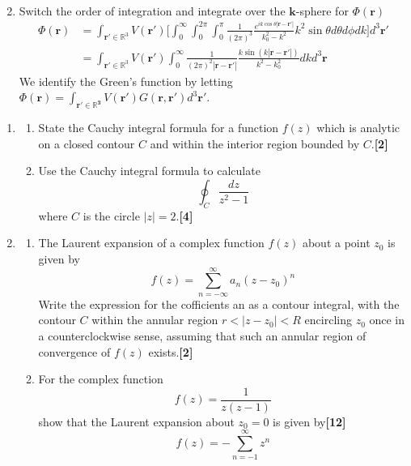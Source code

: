 \documentclass[a4paper]{article}
\begin{document}
\begin{ans}
\begin{enumerate}[label=(\roman*)]
\begin{align}
\end{align}
\item Switch the order of integration and integrate over the $\mathbf{k}$-sphere for $\Phi(\mathbf{r})$
\begin{align}
\Phi(\mathbf{r})&=\int_{\mathbf{r'}\in\mathbb{R}^3}V(\mathbf{r'})\bigg[\int_0^\infty\int_0^{2\pi}\int_0^{\pi}\frac{1}{(2\pi)^3}\frac{e^{ik\cos\theta|\mathbf{r}-\mathbf{r'}|}}{k_0^2-k^2}k^2\sin\theta d\theta d\phi dk\bigg]d^3\mathbf{r'}\nonumber\\&=\int_{\mathbf{r'}\in\mathbb{R}^3}V(\mathbf{r'})\int_0^\infty\frac{1}{(2\pi)^2|\mathbf{r}-\mathbf{r'}|}\frac{k\sin(k|\mathbf{r}-\mathbf{r'}|)}{k^2-k_0^2}dkd^3\mathbf{r}\nonumber
\end{align}
We identify the Green's function by letting $\Phi(\mathbf{r})=\int_{\mathbf{r'\in\mathbb{R}^3}}V(\mathbf{r'})G(\mathbf{r},\mathbf{r'})d^3\mathbf{r'}$.
\end{enumerate}
\end{ans}
\newpage
\begin{qns}\leavevmode
\begin{enumerate}[label=(\roman*)]
\item 
\begin{enumerate}[label=(\alph*)]
\item State the Cauchy integral formula for a function $f(z)$ which is analytic on a closed contour $C$ and within the interior region bounded by $C$.\hfill\textbf{[2]}
\item Use the Cauchy integral formula to calculate
$$\oint_C\frac{dz}{z^2-1}$$
where $C$ is the circle $|z| = 2$.\hfill\textbf{[4]}
\end{enumerate}
\item 
\begin{enumerate}
\item The Laurent expansion of a complex function $f(z)$ about a point $z_0$ is given by
$$f(z)=\sum_{n=-\infty}^\infty a_n(z-z_0)^n$$
Write the expression for the cofficients an as a contour integral, with the contour $C$ within the annular region $r < |z−z_0| < R$ encircling $z_0$ once in a counterclockwise sense, assuming that such an annular region of convergence of $f(z)$ exists.\hfill\textbf{[2]}
\item For the complex function
$$f(z)=\frac{1}{z(z-1)}$$
show that the Laurent expansion about $z_0 = 0$ is given by\hfill\textbf{[12]}
$$f(z)=-\sum_{n=-1}^\infty z^n$$
\end{enumerate}
\end{enumerate}
\end{qns}
\end{document}
